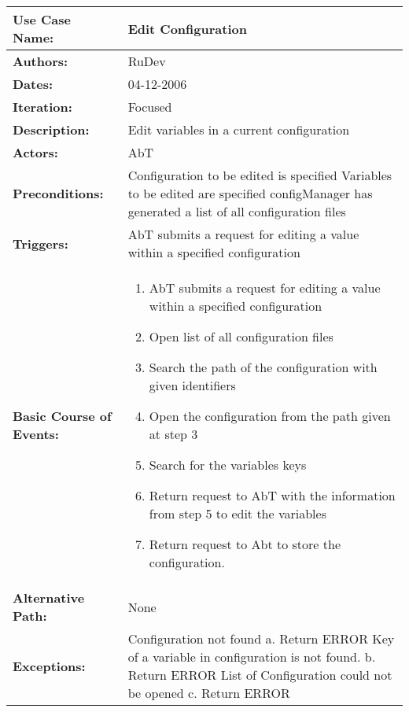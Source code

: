 \begin{tabularx}{\linewidth}{|l|X|}
\hline
\textbf{Use Case Name:} & \textbf{Edit Configuration} \\
\hline
\textbf{Authors:} & RuDev \\
\hline
\textbf{Dates:} & 04-12-2006 \\
\hline
\textbf{Iteration:} & Focused \\
\hline
\textbf{Description:} & Edit variables in a current configuration\\
\hline
\textbf{Actors:} & AbT \\
\hline
\textbf{Preconditions:} & Configuration to be edited is specified \newline Variables to be edited are specified \newline configManager has generated a list of all configuration files \\
\hline
\textbf{Triggers:} & AbT submits a request for editing a value within a specified configuration \\
\hline
\textbf{Basic Course of Events:} & 
\begin{minipage}{\linewidth} 
  \vspace{0.05em}
  \begin{enumerate}
   \item AbT submits a request for editing a value within a specified configuration
   \item Open list of all configuration files
   \item Search the path of the configuration with given identifiers
   \item Open the configuration from the path given at step 3
   \item Search for the variables keys
   \item Return request to AbT with the information from step 5 to edit the variables
   \item Return request to Abt to store the configuration.
  \end{enumerate}
  \vspace{0.05em}
\end{minipage}
\\
\hline 
\textbf{Alternative Path:} & None  \\
\hline
\textbf{Exceptions:} & Configuration not found \newline a. Return ERROR \newline\newline Key of a variable in configuration is not found. \newline b. Return ERROR \newline\newline List of Configuration could not be opened \newline c. Return ERROR \\
\hline
\end{tabularx}
